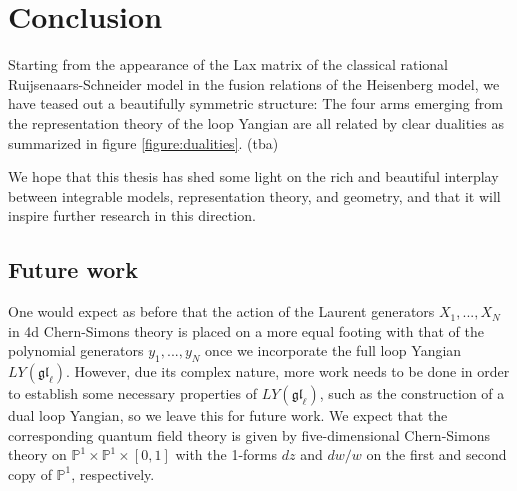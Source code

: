 \documentclass[11pt]{report}
\newtheorem{lemma}[theorem]{Lemma}
\newtheorem{prop}[theorem]{Proposition}
\theoremstyle{definition}
\theoremstyle{remark}
\theoremstyle{remark}
\renewcommand{\P}{\mathbb{P}}
\begin{document}
%
%

\chapter{Conclusion}\label{chapter:conclusion}

Starting from the appearance of the Lax matrix of the classical rational Ruijsenaars-Schneider model in the fusion relations of the Heisenberg model, we have teased out a beautifully symmetric structure: The four arms emerging from the representation theory of the loop Yangian are all related by clear dualities as summarized in figure \ref{figure:dualities}. (tba)

We hope that this thesis has shed some light on the rich and beautiful interplay between integrable models, representation theory, and geometry, and that it will inspire further research in this direction.

\section*{Future work}

One would expect as before that the action of the Laurent generators $X_1,...,X_N$ in 4d Chern-Simons theory is placed on a more equal footing with that of the polynomial generators $y_1,...,y_N$ once we incorporate the full loop Yangian $LY(\mathfrak{gl}_\ell)$. However, due its complex nature, more work needs to be done in order to establish some necessary properties of $LY(\mathfrak{gl}_\ell)$, such as the construction of a dual loop Yangian, so we leave this for future work. We expect that the corresponding quantum field theory is given by five-dimensional Chern-Simons theory on $\P^1 \times \P^1 \times [0,1]$ with the 1-forms $dz$ and $dw/w$ on the first and second copy of $\P^1$, respectively.
\end{document}

